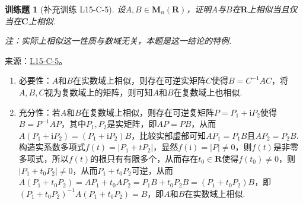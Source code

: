 \documentclass[12pt,fontset=fandol]{ctexart}
\newtheorem{exercise}{训练题}[section]
\begin{document}
\begin{exercise}[补充训练 L15-C-5]\label{prob:L15-C-5}
设$A,B\in \mathbf{M}_n(\mathbf{R})$，证明$A$与$B$在$\mathbf{R}$上相似当且仅当在$\mathbf{C}$上相似.

        {\kaishu 注：实际上相似这一性质与数域无关，本题是这一结论的特例.}
\end{exercise}
\noindent 来源：\href{https://github.com/yhwu-is/Linear-Algebra-Left-Undone/blob/new/%E8%AE%B2%E4%B9%89/%E4%B8%93%E9%A2%98/15%20%E7%9B%B8%E4%BC%BC%E6%A0%87%E5%87%86%E5%BD%A2%EF%BC%9A%E5%A4%8D%E6%95%B0%E5%9F%9F%E4%B8%8A%E7%9A%84%E5%B0%9D%E8%AF%95%E4%B8%8E%E7%90%86%E8%AE%BA.tex}{L15-C-5}。
\begin{solve}
\begin{enumerate}
                \item 必要性：$A$和$B$在实数域上相似，则存在可逆实矩阵$C$使得$B=C^{-1}AC$，将$A,B,C$视为复数域上的矩阵，则可知$A$和$B$在复数域上也相似.

                \item 充分性：若$A$和$B$在复数域上相似，则存在可逆复矩阵$P=P_1+\mathrm{i} P_2$使得$B=P^{-1}AP$，其中$P_1,P_2$是实矩阵，即$AP=PB$，从而$A(P_1+\mathrm{i} P_2)=(P_1+\mathrm{i} P_2)B$，比较实部虚部可知$AP_1=P_1B$且$AP_2=P_2B$. 构造实系数多项式$f(t)=|P_1+tP_2|$，显然$f(\mathrm{i})=|P|\neq 0$，则$f(t)$是非零多项式，所以$f(t)$的根只有有限多个，从而存在$t_0\in\mathbf{R}$使得$f(t_0)\neq 0$，则$|P_1+t_0P_2|\neq 0$，从而$P_1+t_0P_2$可逆，从而$A(P_1+t_0P_2)=AP_1+t_0AP_2=P_1B+t_0P_2B=(P_1+t_0P_2)B$，即$(P_1+t_0P_2)^{-1}A(P_1+t_0P_2)=B$，即$A$和$B$在实数域上相似.
            \end{enumerate}
\end{solve}
\end{document}

